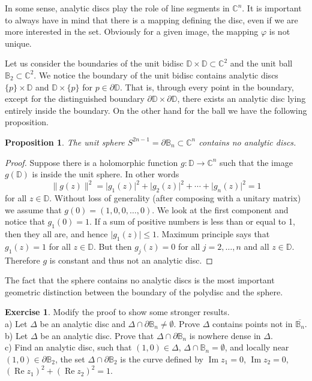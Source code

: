 \documentclass[12pt,openany]{book}
\renewcommand{\Re}{\operatorname{Re}}
\renewcommand{\Im}{\operatorname{Im}}
\newcommand{\sabs}[1]{\lvert {#1} \rvert}
\newcommand{\snorm}[1]{\lVert {#1} \rVert}
\newcommand{\C}{{\mathbb{C}}}
\newcommand{\D}{{\mathbb{D}}}
\newcommand{\bB}{{\mathbb{B}}}
\newcommand{\bD}{{\mathbb{D}}}
\theoremstyle{plain}
\newtheorem{prop}[thm]{Proposition}
\theoremstyle{remark}
\theoremstyle{definition}
\newenvironment{exbox}{%
    \def\FrameCommand{\vrule width 1pt \relax\hspace {10pt}}%
    \MakeFramed {\advance \hsize -\width \FrameRestore }%
}{%
    \endMakeFramed
}
\theoremstyle{exercise}
\newtheorem{exercise}{Exercise}[section]
\theoremstyle{example}
\begin{document}
In some sense, analytic discs play the role of line segments in $\C^n$.  It
is important to always have in mind that there is a mapping defining the
disc, even if we are more interested in the set.  Obviously for a given
image, the mapping $\varphi$ is not unique.

Let us consider the boundaries of 
the unit bidisc $\bD \times \bD \subset \C^2$
and the unit ball $\bB_2 \subset \C^2$.  We notice the boundary
of the unit bidisc contains analytic discs $\{p\} \times \bD$
and $\bD \times \{p\}$ for $p \in \partial \bD$.  That is, through
every point in the boundary, except for the distinguished
boundary $\partial \D \times \partial \D$, there exists an analytic disc
lying entirely inside the boundary.  On the other hand for the ball
we have the following proposition.

\begin{prop}
%
The unit sphere $S^{2n-1} = \partial \bB_n \subset \C^n$ 
contains no analytic discs.
\end{prop}

\begin{proof}
Suppose there is a holomorphic function $g \colon \D \to \C^n$
such that the image $g(\D)$ is inside the unit sphere.  In other words
\begin{equation*}
\snorm{g(z)}^2 = \sabs{g_1(z)}^2 + \sabs{g_2(z)}^2 + \cdots + \sabs{g_n(z)}^2 = 1
\end{equation*}
for all $z \in \D$.  Without loss of generality (after composing with a
unitary matrix) we assume that
$g(0) = (1,0,0,\ldots,0)$.  We look at the first component
and notice that $g_1(0) = 1$.  If a sum of
positive numbers is less than or equal to 1,
then they all are, and hence $\sabs{g_1(z)} \leq 1$.  Maximum principle
says
that $g_1(z) = 1$ for all $z \in \D$.  But then $g_j(z) = 0$
for all $j=2,\ldots,n$ and all $z \in \D$.  Therefore $g$ is constant and
thus not an analytic disc.
\end{proof}

The fact that the sphere contains no analytic discs
is the most important geometric distinction between the boundary of
the polydisc and the sphere.

\begin{exbox}
\begin{exercise}
Modify the proof to show some stronger results.\\
a) Let $\Delta$ be an analytic disc
and $\Delta \cap \partial \bB_n \not= \emptyset$.
Prove $\Delta$ contains points not in
$\overline{\bB_n}$.\\
b) Let $\Delta$ be an analytic disc.
Prove that $\Delta \cap \partial \bB_n$ is nowhere dense in $\Delta$.\\
c) Find an analytic disc, such that $(1,0) \in \Delta$, $\Delta \cap \bB_n =
\emptyset$, and 
locally near
$(1,0) \in \partial \bB_2$, the set
$\Delta \cap \partial \bB_2$ is the
curve defined by $\Im z_1=0$, $\Im z_2=0$,
$(\Re z_1)^2+ (\Re z_2)^2 = 1$.
\end{exercise}
\end{exbox}
\end{document}
